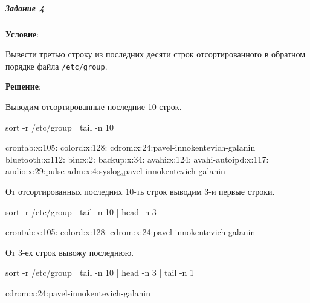 \subparagraph{Задание 4} \textbf{Условие}:

Вывести третью строку из последних десяти строк отсортированного в обратном порядке файла \verb|/etc/group|.

\textbf{Решение}:

Выводим отсортированные последние 10 строк.

\begin{BashBox}
sort -r /etc/group | tail -n 10
\end{BashBox}

\begin{OutBox}
crontab:x:105:
colord:x:128:
cdrom:x:24:pavel-innokentevich-galanin
bluetooth:x:112:
bin:x:2:
backup:x:34:
avahi:x:124:
avahi-autoipd:x:117:
audio:x:29:pulse
adm:x:4:syslog,pavel-innokentevich-galanin
\end{OutBox}

От отсортированных последних 10-ть строк выводим 3-и первые строки. 

\begin{BashBox}
sort -r /etc/group | tail -n 10 | head -n 3
\end{BashBox}

\begin{OutBox}
crontab:x:105:
colord:x:128:
cdrom:x:24:pavel-innokentevich-galanin
\end{OutBox}

От 3-ех строк вывожу последнюю.

\begin{BashBox}
sort -r /etc/group | tail -n 10 | head -n 3 | tail -n 1
\end{BashBox}

\begin{OutBox}
cdrom:x:24:pavel-innokentevich-galanin
\end{OutBox}
